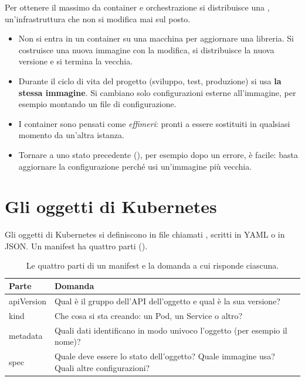 Per ottenere il massimo da container e orchestrazione si distribuisce una ,
un'infrastruttura che non si modifica mai sul posto.
\begin{itemize}
  \item Non si entra in un container su una macchina per aggiornare una libreria. Si costruisce una nuova immagine con
    la modifica, si distribuisce la nuova versione e si termina la vecchia.
  \item Durante il ciclo di vita del progetto (sviluppo, test, produzione) si usa \textbf{la stessa immagine}. Si
    cambiano solo configurazioni esterne all'immagine, per esempio montando un file di configurazione.
  \item I container sono pensati come \emph{effimeri}: pronti a essere sostituiti in qualsiasi momento da un'altra
    istanza.
  \item Tornare a uno stato precedente (), per esempio dopo un errore, è facile: basta aggiornare la
    configurazione perché usi un'immagine più vecchia.
\end{itemize}

\section{Gli oggetti di Kubernetes}
\label{sec:k8s-oggetti}

Gli oggetti di Kubernetes si definiscono in file chiamati , scritti in YAML o in JSON. Un manifest
ha quattro parti ().

\begin{table}[ht]
\centering
\small
\caption{Le quattro parti di un manifest e la domanda a cui risponde ciascuna.}
\label{tab:k8s-manifest}
\begin{tabularx}{0.9\linewidth}{>{\ttfamily}lX}
\toprule
\normalfont Parte & Domanda \\
\midrule
apiVersion & Qual è il gruppo dell'API dell'oggetto e qual è la sua versione? \\
kind & Che cosa si sta creando: un Pod, un Service o altro? \\
metadata & Quali dati identificano in modo univoco l'oggetto (per esempio il nome)? \\
spec & Quale deve essere lo stato dell'oggetto? Quale immagine usa? Quali altre configurazioni? \\
\bottomrule
\end{tabularx}
\end{table}

